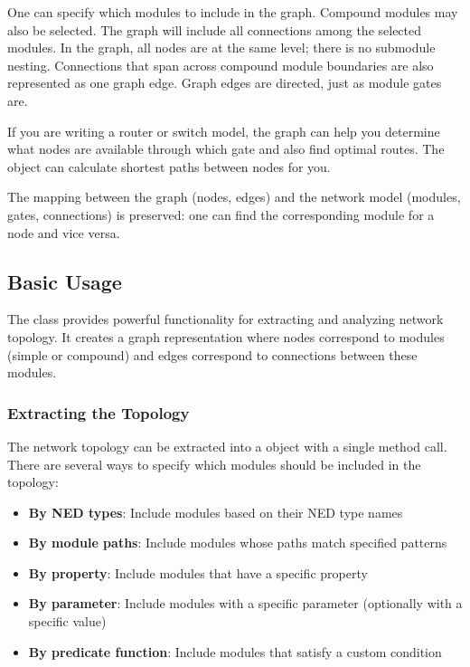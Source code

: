 One can specify which modules to include in the graph. Compound modules
may also be selected. The graph will include all connections among the
selected modules. In the graph, all nodes are at the same level;
there is no submodule nesting. Connections that span across compound
module boundaries are also represented as one graph edge. Graph edges
are directed, just as module gates are.

If you are writing a router or switch model, the 
graph can help you determine what nodes are available through which
gate and also find optimal routes. The
 object can calculate shortest paths between nodes for you.

The mapping between the graph (nodes, edges) and the network model (modules,
gates, connections) is preserved: one can find the corresponding module for
a  node and vice versa.

\subsection{Basic Usage}
\label{sec:sim-lib:ctopology-basic-usage}

The  class provides powerful functionality for extracting and
analyzing network topology. It creates a graph representation where nodes
correspond to modules (simple or compound) and edges correspond to connections
between these modules.

\subsubsection{Extracting the Topology}
\label{sec:sim-lib:ctopology-extraction}

The network topology can be extracted into a  object with a
single method call. There are several ways to specify which modules should be
included in the topology:

\begin{itemize}
  \item \textbf{By NED types}: Include modules based on their NED type names
  \item \textbf{By module paths}: Include modules whose paths match specified patterns
  \item \textbf{By property}: Include modules that have a specific property
  \item \textbf{By parameter}: Include modules with a specific parameter (optionally with a specific value)
  \item \textbf{By predicate function}: Include modules that satisfy a custom condition
\end{itemize}

